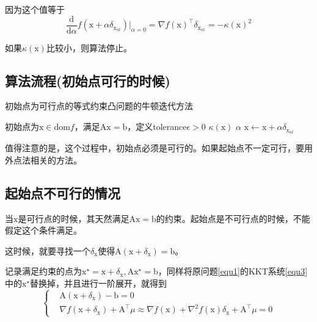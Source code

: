 \documentclass[a4paper]{D:/MyRepo/Script/latex/PaperReadingLog}
\begin{document}
因为这个值等于
$$
\frac{\mathrm{d}}{\mathrm{d}\alpha} f(\mathrm{x}+\alpha\delta_{\mathrm{x}_{nt}})\left.\right|_{\alpha=0}=\nabla f(\mathrm{x})^\top \delta_{\mathrm{x}_{nt}}=-\kappa(\mathrm{x})^2
$$

如果$\kappa(\mathrm{x})$比较小，则算法停止。

\subsection{算法流程(初始点可行的时候)}

\begin{algorithm}[H]
	\caption{初始点为可行点的等式约束凸问题的牛顿迭代方法} 
	\begin{algorithmic}[1]
		\STATE 初始点为$\mathrm{x}\in\mathrm{dom} f$，满足$\mathrm{A}\mathrm{x}=\mathrm{b}$，定义tolerance$\epsilon>0$
        \STATE {}$\kappa(\mathrm{x})$
            \STATE {}
        \ENDIF
        \STATE {}$\alpha$
        \STATE {}$\mathrm{x}\leftarrow \mathrm{x}+\alpha\delta_{\mathrm{x}_{nt}}$
        \ENDWHILE
	\end{algorithmic}
\end{algorithm}

值得注意的是，这个过程中，初始点必须是可行的。如果起始点不一定可行，要用外点法相关的方法。

\subsection{起始点不可行的情况}
当$\mathrm{x}$是可行点的时候，其天然满足$\mathrm{A}\mathrm{x}=\mathrm{b}$的约束。起始点是不可行点的时候，不能假定这个条件满足。

这时候，就要寻找一个$\delta_{\mathrm{x}}$使得$\mathrm{A}(\mathrm{x}+\delta_{\mathrm{x}})=\mathrm{b}$。

记录满足约束的点为$\mathrm{x}^\star=\mathrm{x}+\delta_\mathrm{x},\mathrm{A}\mathrm{x}^\star=\mathrm{b}$，同样将原问题\ref{equ1}的KKT系统\ref{equ3}中的$\mathrm{x}^\star$替换掉，并且进行一阶展开，就得到
\begin{equation}
    \label{equ6}
    \left\{
    \begin{aligned}
        &\mathrm{A}(\mathrm{x}+\delta_\mathrm{x})-\mathrm{b}=0\\
        &\nabla f(\mathrm{x}+\delta_\mathrm{x})+\mathrm{A}^\top \mu\approx \nabla f(\mathrm{x})+\nabla^2 f(\mathrm{x})\delta_\mathrm{x}+\mathrm{A}^\top \mu=0
    \end{aligned}
    \right.
\end{equation}
\end{document}

